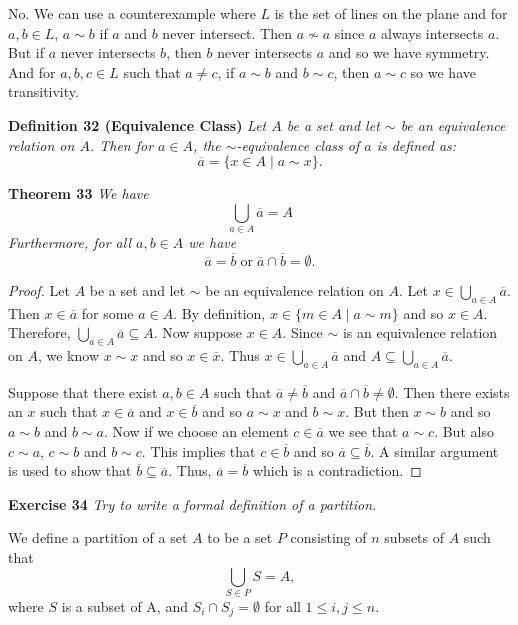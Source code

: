 \documentclass{article}
\begin{document}
\begin{flushleft}
No. We can use a counterexample where $L$ is the set of lines on the plane and for $a,b \in L$, $a \sim b$ if $a$ and $b$ never intersect. Then $a \nsim a$ since $a$ always intersects $a$. But if $a$ never intersects $b$, then $b$ never intersects $a$ and so we have symmetry. And for $a,b,c \in L$ such that $a \neq c$, if $a \sim b$ and $b \sim c$, then $a \sim c$ so we have transitivity.\newline

\textbf{Definition 32 (Equivalence Class)}
\textsl{Let $A$ be a set and let $\sim$ be an equivalence relation on $A$. Then for $a \in A$, the $\sim$-equivalence class of $a$ is defined as:
\[
\overline{a} = \{x \in A \mid a \sim x\}.
\]}

\textbf{Theorem 33}
\textsl{We have
\[
\bigcup_{a \in A} \overline{a} = A
\]
Furthermore, for all $a,b \in A$ we have
\[
\overline{a} = \overline{b} \; \text{or} \; \overline{a} \cap \overline{b} = \emptyset.
\]}
\begin{proof}
Let $A$ be a set and let $\sim$ be an equivalence relation on $A$. Let $x \in \bigcup_{a \in A} \overline{a}$. Then $x \in \overline{a}$ for some $a \in A$. By definition, $x \in \{ m \in A \mid a \sim m \}$ and so $x \in A$. Therefore, $\bigcup_{a \in A} \overline{a} \subseteq A$. Now suppose $x \in A$. Since $\sim$ is an equivalence relation on $A$, we know $x \sim x$ and so $x \in \overline{x}$. Thus $x \in \bigcup_{a \in A} \overline{a}$ and $A \subseteq \bigcup_{a \in A} \overline{a}$.\newline

Suppose that there exist $a,b \in A$ such that $\overline{a} \neq \overline{b}$ and $\overline{a} \cap \overline{b} \neq \emptyset$. Then there exists an $x$ such that $x \in \overline{a}$ and $x \in \overline{b}$ and so $a \sim x$ and $b \sim x$. But then $x \sim b$ and so $a \sim b$ and $b \sim a$. Now if we choose an element $c \in \overline{a}$ we see that $a \sim c$. But also $c \sim a$, $c \sim b$ and $b \sim c$. This implies that $c \in \overline{b}$ and so $\overline{a} \subseteq \overline{b}$. A similar argument is used to show that $\overline{b} \subseteq \overline{a}$. Thus, $\overline{a} = \overline{b}$ which is a contradiction.
\end{proof}

\textbf{Exercise 34}
\textsl{Try to write a formal definition of a partition.}\newline

We define a partition of a set $A$ to be a set $P$ consisting of $n$ subsets of $A$ such that
\[
\bigcup_{S \in P} S = A,
\]
where $S$ is a subset of A, and $S_i \cap S_j =\emptyset$ for all $1 \leq i,j \leq n$.\newline


\end{flushleft}
\end{document}
